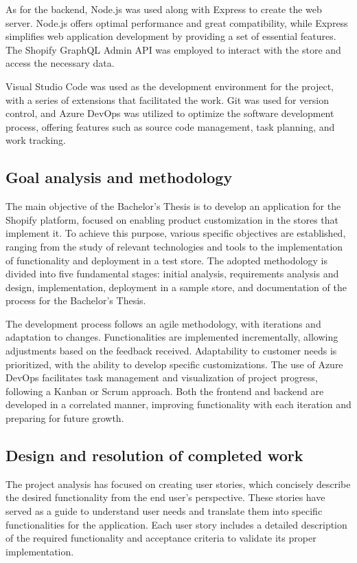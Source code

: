 \documentclass[11pt]{article}
\begin{document}
As for the backend, Node.js was used along with Express to create the web server. Node.js offers optimal performance and great compatibility, 
while Express simplifies web application development by providing a set of essential features. The Shopify GraphQL Admin API was employed to 
interact with the store and access the necessary data.

Visual Studio Code was used as the development environment for the project, with a series of extensions that facilitated the work. Git was 
used for version control, and Azure DevOps was utilized to optimize the software development process, offering features such as source code 
management, task planning, and work tracking.

\subsection{Goal analysis and methodology}
The main objective of the Bachelor's Thesis is to develop an application for the Shopify platform, focused on enabling product customization
in the stores that implement it. To achieve this purpose, various specific objectives are established, ranging from the study of relevant technologies
and tools to the implementation of functionality and deployment in a test store. The adopted methodology is divided into five 
fundamental stages: initial analysis, requirements analysis and design, implementation, deployment in a sample store, and documentation of the process for the Bachelor's Thesis.

The development process follows an agile methodology, with iterations and adaptation to changes. Functionalities are implemented incrementally,
allowing adjustments based on the feedback received. Adaptability to customer needs is prioritized, with the ability to develop specific customizations.
The use of Azure DevOps facilitates task management and visualization of project progress, following a Kanban or Scrum approach. Both the frontend 
and backend are developed in a correlated manner, improving functionality with each iteration and preparing for future growth.

\subsection{Design and resolution of completed work }
The project analysis has focused on creating user stories, which concisely describe the desired functionality from the end user's perspective.
These stories have served as a guide to understand user needs and translate them into specific functionalities for the application. 
Each user story includes a detailed description of the required functionality and acceptance criteria to validate its proper implementation.
\end{document}
